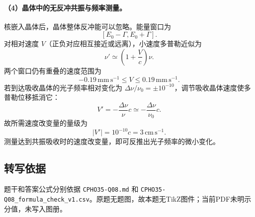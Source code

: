 \paragraph{（4）晶体中的无反冲共振与频率测量。} 核嵌入晶体后，晶体整体反冲能可以忽略。能量窗口为
\[
[E_0-\Gamma,E_0+\Gamma].
\]
对相对速度 $V$（正负对应相互接近或远离），小速度多普勒近似为
\[
\nu'\simeq\left(1+\frac{V}{c}\right)\nu.
\]
两个窗口仍有重叠的速度范围为
\[
\boxed{-0.19\,\mathrm{mm\,s^{-1}}\le V\le0.19\,\mathrm{mm\,s^{-1}}.}
\]
若到达吸收晶体的光子频率相对变化为 $\Delta\nu/\nu_0=\pm10^{-10}$，调节吸收晶体速度使多普勒位移抵消它：
\[
V'=-\frac{\Delta\nu}{\nu}c\simeq-\frac{\Delta\nu}{\nu_0}c.
\]
故所需速度改变量的量级为
\[
\boxed{|V'|=10^{-10}c=3\,\mathrm{cm\,s^{-1}}.}
\]
测量达到共振吸收时的速度改变量，即可反推出光子频率的微小变化。

\subsection{转写依据}
题干和答案公式分别依据 \texttt{CPHO35-Q08.md} 和 \texttt{CPHO35-Q08\_formula\_check\_v1.csv}。原题无题图，故本题无TikZ图件；当前PDF未明示分值，未写入图册。
